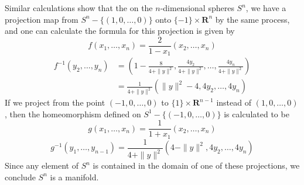 \begin{example}
%
%
%
%
    Similar calculations show that the on the $n$-dimensional spheres $S^n$, we have a projection map from $S^n - \{ (1,0,\dots,0) \}$ onto $\{ -1 \} \times \mathbf{R}^n$ by the same process, and one can calculate the formula for this projection is given by
    \[ f(x_1, \dots, x_n) = \frac{2}{1 - x_1}(x_2, \dots, x_n) \]
    \begin{align*}
        f^{-1}(y_2, \dots, y_n) &= \left(1 - \frac{8}{4 + \| y \|^2}, \frac{4y_2}{4 + \| y \|^2}, \dots, \frac{4y_n}{4 + \| y \|^2} \right)\\
        &= \frac{1}{4 + \| y \|^2} \left( \| y \|^2 - 4, 4y_2, \dots, 4y_n \right)
    \end{align*}
    If we project from the point $(-1,0,\dots,0)$ to $\{ 1 \} \times \mathbf{R}^{n-1}$ instead of $(1,0,\dots,0)$, then the homeomorphism defined on $S^1 - \{ (-1,0,\dots,0) \}$ is calculated to be
    \[ g(x_1, \dots, x_n) = \frac{1}{1 + x_1}(x_2, \dots, x_n) \]
    \[ g^{-1}(y_1, \dots, y_{n-1}) = \frac{1}{4 + \| y \|^2} \left( 4 - \| y \|^2, 4y_2, \dots, 4y_n \right) \]
    Since any element of $S^n$ is contained in the domain of one of these projections, we conclude $S^n$ is a manifold.
\end{example}

